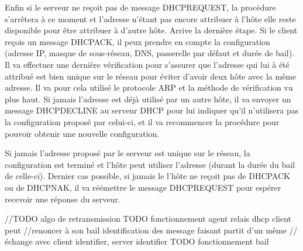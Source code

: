 Enfin si le serveur ne reçoit pas de message DHCPREQUEST, la procédure
s'arrêtera à ce moment et l'adresse n'étant pas encore attribuer à l'hôte elle
reste disponible pour être attribuer à d'autre hôte.  Arrive la dernière étape.
Si le client reçois un message DHCPACK, il peux prendre en compte la
configuration (adresse IP, masque de sous-réseau, DNS, passerelle par défaut et
durée de bail). Il va effectuer une dernière vérification pour s'assurer que
l'adresse qui lui à été attribué est bien unique sur le réseau pour éviter
d'avoir deux hôte avec la même adresse. Il va pour cela utilisé le protocole
ARP et la méthode de vérification vu plus haut. Si jamais l'adresse est déjà
utilisé par un autre hôte, il va envoyer un message DHCPDECLINE au serveur DHCP
pour lui indiquer qu'il n'utilisera pas la configuration proposé par celui-ci,
et il va recommencer la procédure pour pouvoir obtenir une nouvelle
configuration.

Si jamais l'adresse proposé par le serveur est unique sur le réseau, la
configuration est terminé et l'hôte peut utiliser l'adresse (durant la durée du
bail de celle-ci).  Dernier cas possible, si jamais le l'hôte ne reçoit pas de
DHCPACK ou de DHCPNAK, il va réémettre le message DHCPREQUEST pour espérer
recevoir une réponse du serveur.

//TODO algo de retransmission TODO fonctionnement agent relais dhcp client peut
//renoncer à son bail identification des message faisant partit d'un même
//échange avec client identifier, server identifier TODO fonctionnement bail

